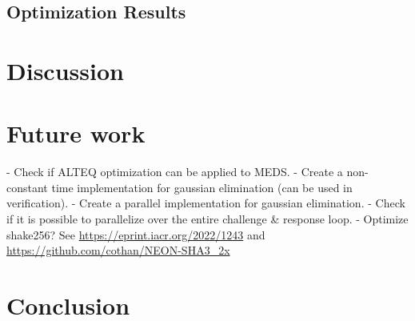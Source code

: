 \documentclass[11pt,a4paper]{report}
\begin{document}
\section{Optimization Results}

\chapter{Discussion}
\label{ch:discussion}

\chapter{Future work}
\label{ch:futurework}
- Check if ALTEQ optimization can be applied to MEDS.
- Create a non-constant time implementation for gaussian elimination (can be used in verification).
- Create a parallel implementation for gaussian elimination.
- Check if it is possible to parallelize over the entire challenge \& response loop.
- Optimize shake256? See \url{https://eprint.iacr.org/2022/1243} and \url{https://github.com/cothan/NEON-SHA3\_2x}

\chapter{Conclusion}
\label{ch:conclusion}





\end{document}
